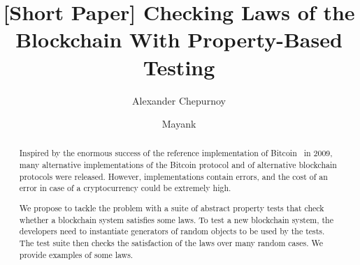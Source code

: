 \documentclass[]{llncs}   %
\begin{document}
\title{[Short Paper] Checking Laws of the Blockchain With Property-Based Testing}

\author{Alexander Chepurnoy \and Mayank}
\maketitle

\begin{abstract}
Inspired by the enormous success of the reference implementation of Bitcoin~\cite{Nakamoto2008} in 2009, many alternative implementations of the Bitcoin protocol and of alternative blockchain protocols were released. However, implementations contain errors, and the cost of an error in case of a cryptocurrency could be extremely high. 

We propose to tackle the problem with a suite of abstract property tests that check whether a blockchain system satisfies some laws. 
To test a new blockchain system, the developers need to instantiate generators of random objects to be used by the tests. The test suite then checks the satisfaction of the laws over many random cases. We provide examples of some laws.
\end{abstract}














\newpage
\appendix


\end{document}

